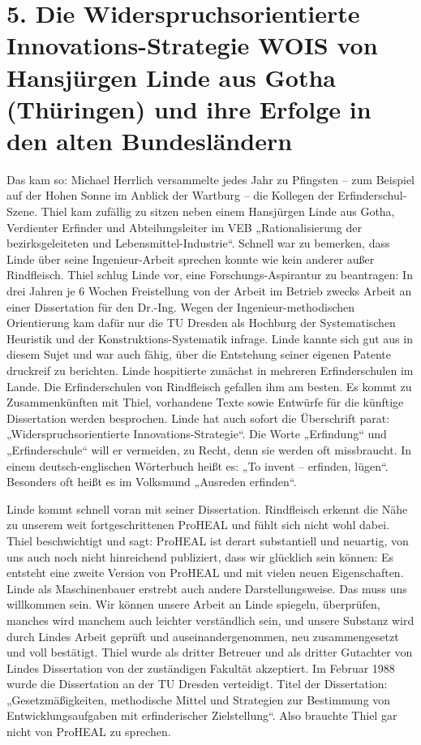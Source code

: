 \documentclass[12pt,a4paper]{article}
\begin{document}
\section*{5. Die Widerspruchsorientierte Innovations-Strategie WOIS von
  Hansjürgen Linde aus Gotha (Thüringen) und ihre Erfolge in den alten
  Bundesländern}

Das kam so: Michael Herrlich versammelte jedes Jahr zu Pfingsten – zum Beispiel
auf der Hohen Sonne im Anblick der Wartburg – die Kollegen der
Erfinderschul-Szene.  Thiel kam zufällig zu sitzen neben einem Hansjürgen Linde
aus Gotha, Verdienter Erfinder und Abteilungsleiter im VEB „Rationalisierung
der bezirksgeleiteten und Lebensmittel-Industrie“.  Schnell war zu bemerken,
dass Linde über seine Ingenieur-Arbeit sprechen konnte wie kein anderer außer
Rindfleisch. Thiel schlug Linde vor, eine Forschungs-Aspirantur zu beantragen:
In drei Jahren je 6 Wochen Freistellung von der Arbeit im Betrieb zwecks Arbeit
an einer Dissertation für den Dr.-Ing. Wegen der Ingenieur-methodischen
Orientierung kam dafür nur die TU Dresden als Hochburg der Systematischen
Heuristik und der Konstruktions-Systematik infrage. Linde kannte sich gut aus
in diesem Sujet und war auch fähig, über die Entstehung seiner eigenen Patente
druckreif zu berichten. Linde hospitierte zunächst in mehreren Erfinderschulen
im Lande.  Die Erfinderschulen von Rindfleisch gefallen ihm am besten. Es kommt
zu Zusammenkünften mit Thiel, vorhandene Texte sowie Entwürfe für die künftige
Dissertation werden besprochen. Linde hat auch sofort die Überschrift parat:
„Widerspruchsorientierte Innovations-Strategie“. Die Worte „Erfindung“ und
„Erfinderschule“ will er vermeiden, zu Recht, denn sie werden oft missbraucht.
In einem deutsch-englischen Wörterbuch heißt es: „To invent – erfinden, lügen“.
Besonders oft heißt es im Volksmund „Ausreden erfinden“.

\enlargethispage{-2em}
Linde kommt schnell voran mit seiner Dissertation. Rindfleisch erkennt die Nähe
zu unserem weit fortgeschrittenen ProHEAL und fühlt sich nicht wohl dabei.
Thiel beschwichtigt und sagt: ProHEAL ist derart substantiell und neuartig, von
uns auch noch nicht hinreichend publiziert, dass wir glücklich sein können: Es
entsteht eine zweite Version von ProHEAL und mit vielen neuen Eigenschaften.
Linde als Maschinenbauer erstrebt auch andere Darstellungsweise. Das muss uns
willkommen sein. Wir können unsere Arbeit an Linde spiegeln, überprüfen,
manches wird manchem auch leichter verständlich sein, und unsere Substanz wird
durch Lindes Arbeit geprüft und auseinandergenommen, neu zusammengesetzt und
voll bestätigt. Thiel wurde als dritter Betreuer und als dritter Gutachter von
Lindes Dissertation von der zuständigen Fakultät akzeptiert. Im Februar 1988
wurde die Dissertation an der TU Dresden verteidigt. Titel der Dissertation:
„Gesetzmäßigkeiten, methodische Mittel und Strategien zur Bestimmung von
Entwicklungsaufgaben mit erfinderischer Zielstellung“. Also brauchte Thiel gar
nicht von ProHEAL zu sprechen.
\end{document}
